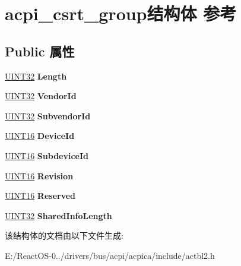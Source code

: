 \hypertarget{structacpi__csrt__group}{}\section{acpi\+\_\+csrt\+\_\+group结构体 参考}
\label{structacpi__csrt__group}
\subsection*{Public 属性}
\begin{DoxyCompactItemize}
\item 
\mbox{\label{structacpi__csrt__group_a7918ec64b29e474f2eac90792a0b8c7c}} 
\hyperlink{_processor_bind_8h_ae1e6edbbc26d6fbc71a90190d0266018}{U\+I\+N\+T32} {\bfseries Length}
\item 
\mbox{\label{structacpi__csrt__group_aaae17f1b877f31aef204ef890dc2d4c9}} 
\hyperlink{_processor_bind_8h_ae1e6edbbc26d6fbc71a90190d0266018}{U\+I\+N\+T32} {\bfseries Vendor\+Id}
\item 
\mbox{\label{structacpi__csrt__group_a3ba917afaf533bcecd4f513a629e52c2}} 
\hyperlink{_processor_bind_8h_ae1e6edbbc26d6fbc71a90190d0266018}{U\+I\+N\+T32} {\bfseries Subvendor\+Id}
\item 
\mbox{\label{structacpi__csrt__group_aa298805fcaf910c85910434595ad376a}} 
\hyperlink{_processor_bind_8h_a09f1a1fb2293e33483cc8d44aefb1eb1}{U\+I\+N\+T16} {\bfseries Device\+Id}
\item 
\mbox{\label{structacpi__csrt__group_a132e552d02056bbb8ecc50094e06c217}} 
\hyperlink{_processor_bind_8h_a09f1a1fb2293e33483cc8d44aefb1eb1}{U\+I\+N\+T16} {\bfseries Subdevice\+Id}
\item 
\mbox{\label{structacpi__csrt__group_acdf8b743f5803ef47b258e423ae563a7}} 
\hyperlink{_processor_bind_8h_a09f1a1fb2293e33483cc8d44aefb1eb1}{U\+I\+N\+T16} {\bfseries Revision}
\item 
\mbox{\label{structacpi__csrt__group_a460f279be1c12fe956c8d4b48ea302a5}} 
\hyperlink{_processor_bind_8h_a09f1a1fb2293e33483cc8d44aefb1eb1}{U\+I\+N\+T16} {\bfseries Reserved}
\item 
\mbox{\label{structacpi__csrt__group_ade7291f31e1bd7bb8fafa9fa5268bbad}} 
\hyperlink{_processor_bind_8h_ae1e6edbbc26d6fbc71a90190d0266018}{U\+I\+N\+T32} {\bfseries Shared\+Info\+Length}
\end{DoxyCompactItemize}


该结构体的文档由以下文件生成\+:\begin{DoxyCompactItemize}
\item 
E\+:/\+React\+O\+S-\/0../drivers/bus/acpi/acpica/include/actbl2.\+h\end{DoxyCompactItemize}
